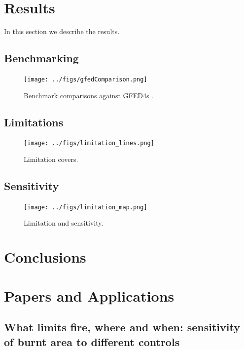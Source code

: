 \documentclass[12pt]{article}
\begin{document}
\section{Results}\label{results}
In this section we describe the results.

\subsection{Benchmarking}

\begin{figure}[!ht]
  \centering
    \texttt{[image: ../figs/gfedComparison.png]}
   
  \caption{Benchmark comparisons against GFED4s \citep{Giglio2013}.}
\end{figure}

\subsection{Limitations}

\begin{figure}[!ht]
  \centering
    \texttt{[image: ../figs/limitation\_lines.png]}
   
  \caption{Limitation covers.}
\end{figure}

\subsection{Sensitivity}

\begin{figure}[!ht]
  \centering
    \texttt{[image: ../figs/limitation\_map.png]}
   
  \caption{Limitation and sensitivity.}
\end{figure}

\section{Conclusions}\label{conclusions}

\section{Papers and Applications}

\subsection{What limits fire, where and when: sensitivity of burnt area to different controls}
\end{document}
